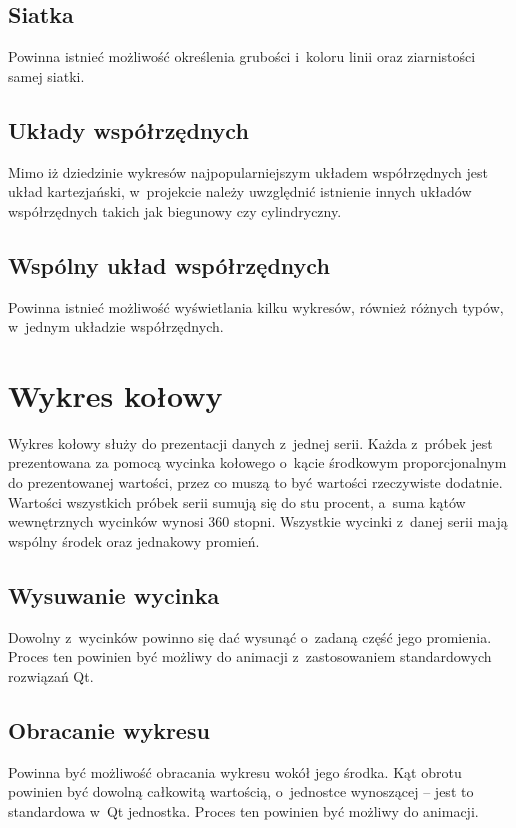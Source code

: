 \subsection{Siatka}
Powinna istnieć możliwość określenia grubości i~koloru linii oraz ziarnistości samej siatki.

\subsection{Układy współrzędnych}
Mimo iż dziedzinie wykresów najpopularniejszym układem współrzędnych jest układ kartezjański, w~projekcie należy uwzględnić istnienie innych układów współrzędnych takich jak biegunowy czy cylindryczny.

\subsection{Wspólny układ współrzędnych}
Powinna istnieć możliwość wyświetlania kilku wykresów, również różnych typów, w~jednym układzie współrzędnych.





\section{Wykres kołowy}
Wykres kołowy służy do prezentacji danych z~jednej serii. Każda z~próbek jest prezentowana za pomocą wycinka kołowego o~kącie środkowym proporcjonalnym do prezentowanej wartości, przez co muszą to być wartości rzeczywiste dodatnie. Wartości wszystkich próbek serii sumują się do stu procent, a~suma kątów wewnętrznych wycinków wynosi 360 stopni. Wszystkie wycinki z~danej serii mają wspólny środek oraz jednakowy promień.

\subsection{Wysuwanie wycinka}
Dowolny z~wycinków powinno się dać wysunąć o~zadaną część jego promienia. Proces ten powinien być możliwy do animacji z~zastosowaniem standardowych rozwiązań Qt.

\subsection{Obracanie wykresu}
Powinna być możliwość obracania wykresu wokół jego środka. Kąt obrotu powinien być dowolną całkowitą wartością, o~jednostce wynoszącej 
-- jest to standardowa w~Qt jednostka. Proces ten powinien być możliwy do animacji.
 

